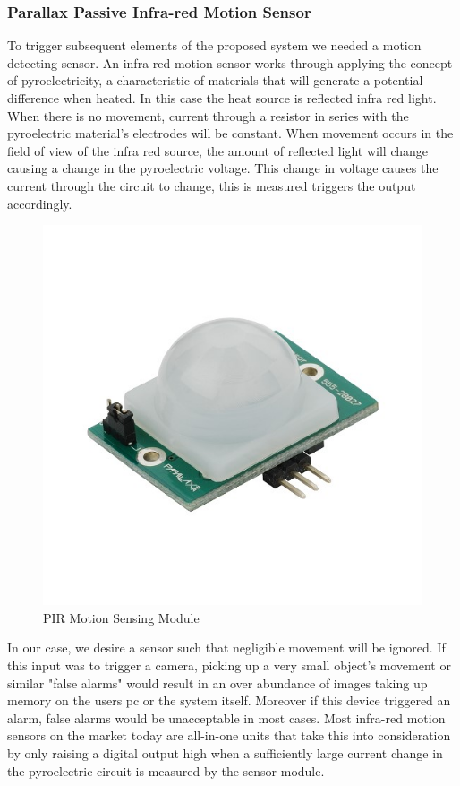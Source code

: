 \subsubsection{Parallax Passive Infra-red Motion Sensor}
\par To trigger subsequent elements of the proposed system we needed a motion detecting sensor. An infra red motion sensor works through applying the concept of pyroelectricity, a characteristic of materials that will generate a potential difference when heated. In this case the heat source is reflected infra red light. When there is no movement, current through a resistor in series with the pyroelectric material's electrodes will be constant. When movement occurs in the field of view of the infra red source, the amount of reflected light will change causing a change in the pyroelectric voltage. This change in voltage causes the current through the circuit to change, this is measured triggers the output accordingly.\cite{Webster}
\begin{figure}[h]
	\centering
	\includegraphics{pirDevice.jpg}
	\caption{PIR Motion Sensing Module}
\end{figure}
\newpage
\par In our case, we desire a sensor such that negligible movement will be ignored. If this input was to trigger a camera, picking up a very small object's movement or similar "false alarms" would result in an over abundance of images taking up memory on the users pc or the system itself. Moreover if this device triggered an alarm, false alarms would be unacceptable in most cases. Most infra-red motion sensors on the market today are all-in-one units that take this into consideration by only raising a digital output high when a sufficiently large current change in the pyroelectric circuit is measured by the sensor module. 
